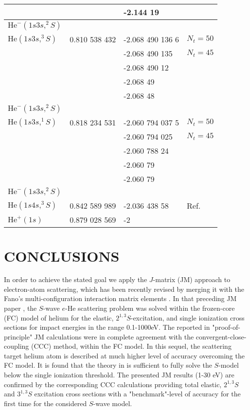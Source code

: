 \documentclass[aip
, pra
, showpacs
, aps
, twocolumn
, groupedaddress
, floatfix
]{revtex4}
\begin{document}
\begin{table}[htb]
\begin{ruledtabular}
\begin{tabular}{llll}
                         &               & -2.144 19        &    \\
\hline
$\mbox{He}^-(1s3s,^2S)$  &&     	 &  \\
\hline
$\mbox{He}(1s3s,^3S)$    & 0.810 538 432 & -2.068 490 136 6 & $N_t=50$  \\
                         &               & -2.068 490 135   & $N_t=45$\\
                         &               & -2.068 490 12    & \\
                         &               & -2.068 49        & \\
                         &               & -2.068 48        & \\
\hline
$\mbox{He}^-(1s3s,^2S)$  &&     	 &  \\
\hline
$\mbox{He}(1s3s,^1S)$    & 0.818 234 531 & -2.060 794 037 5 & $N_t=50$ \\
                         &               & -2.060 794 025   & $N_t=45$\\
                         &               & -2.060 788 24    & \\
                         &               & -2.060 79        & \\
                         &               & -2.060 79        & \\
\hline
$\mbox{He}^-(1s3s,^2S)$  &&       &	   \\
\hline
$\mbox{He}(1s4s,^3S)$    & 0.842 589 989 & -2.036 438 58    & Ref. \cite{DHIF94} \\
\hline
$\mbox{He}^+(1s)$        & 0.879 028 569 & -2 	 &    \\
\end{tabular}
\end{ruledtabular}
\end{table}


\section{CONCLUSIONS}


In order to achieve the stated goal we apply the $J$-matrix (JM) approach to electron-atom scattering,
which has been recently revised by merging it with the Fano's multi-configuration interaction matrix elements \cite{Fano65}.
In that preceding JM paper \cite{BF11},
the $S$-wave $e$-He scattering problem was solved within the frozen-core (FC) model of helium for
the elastic, $2^{1,3}S$-excitation, and single ionization cross sections for impact energies in the range 0.1-1000eV.
The reported in \cite{BF11} "proof-of-principle" JM calculations were in complete agreement with the convergent-close-coupling (CCC) method,
within the FC model.
In this sequel, the scattering target helium atom is described at much higher level of accuracy overcoming the FC model.
It is found that the theory in \cite{BF11} is sufficient to fully solve the $S$-model below the single ionization threshold.
The presented JM results (1-30 eV) are confirmed by the corresponding CCC calculations providing
total elastic, $2^{1,3}S$ and $3^{1,3}S$ excitation cross sections with a "benchmark"-level of accuracy for the first time for the considered $S$-wave model.
\end{document}
